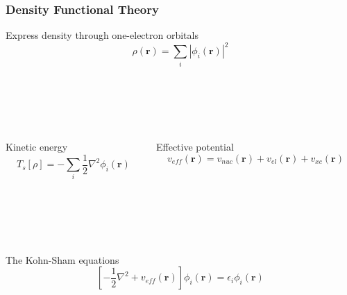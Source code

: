 \documentclass[mathserif, 10pt]{beamer}
\begin{document}
\begin{frame}
    \frametitle{Density Functional Theory}
    \centering
    Express density through one-electron orbitals
    \begin{equation}
	\nonumber
	\rho(\boldsymbol{r}) = \sum_i |\phi_i(\boldsymbol{r})|^2
    \end{equation}
    \ \\
    \ \\
    \ \\
    \ \\
    \pause
    \begin{columns}
    \begin{column}{.50\textwidth}
    \centering
    Kinetic energy
    \begin{equation}
	\nonumber
	T_s[\rho] = -\sum_i \frac{1}{2}\nabla^2\phi_i(\boldsymbol{r})
    \end{equation}
    \end{column}
    \begin{column}{.50\textwidth}
    \centering
    Effective potential
    \begin{equation}
	\nonumber
	v_{eff}(\boldsymbol{r}) = v_{nuc}(\boldsymbol{r}) + v_{el}(\boldsymbol{r}) + v_{xc}(\boldsymbol{r})
    \end{equation}
    \end{column}
    \end{columns}
    \ \\
    \ \\
    \ \\
    \ \\
    \pause
    \centering
    The Kohn-Sham equations
    \begin{equation}
	\nonumber
	\left[-\frac{1}{2}\nabla^2 + v_{eff}(\boldsymbol{r})\right]\phi_i(\boldsymbol{r}) = 
	\epsilon_i\phi_i(\boldsymbol{r})
    \end{equation}
\end{frame}
\end{document}
